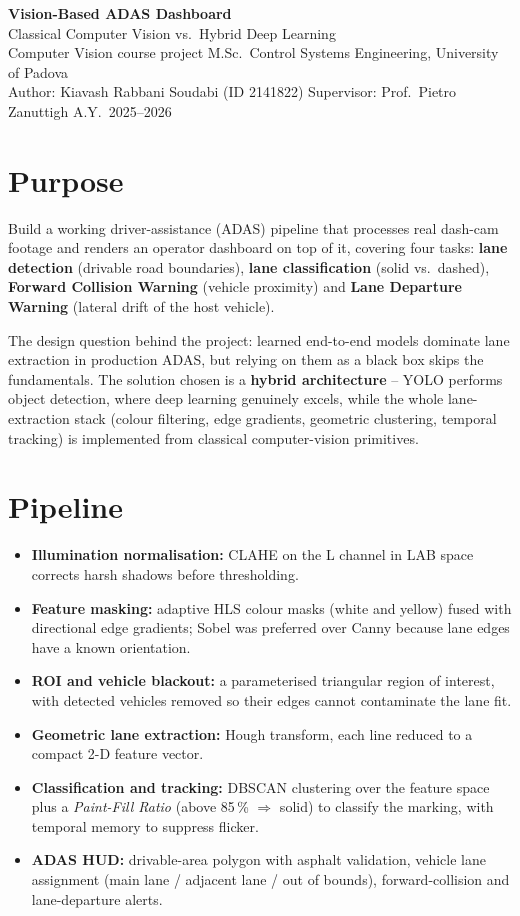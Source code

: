 \documentclass[10pt,a4paper]{article}
\begin{document}
\begin{center}
{\Large\bfseries Vision-Based ADAS Dashboard}\\[2pt]
{\large Classical Computer Vision vs.\ Hybrid Deep Learning}\\[4pt]
{\small Computer Vision course project \textendash{} M.Sc.\ Control Systems Engineering, University of Padova}\\
{\small Author: Kiavash Rabbani Soudabi (ID 2141822) \textendash{} Supervisor: Prof.\ Pietro Zanuttigh \textendash{} A.Y.\ 2025--2026}
\end{center}

\section*{Purpose}
Build a working driver-assistance (ADAS) pipeline that processes real dash-cam footage and renders an operator
dashboard on top of it, covering four tasks: \textbf{lane detection} (drivable road boundaries),
\textbf{lane classification} (solid vs.\ dashed), \textbf{Forward Collision Warning} (vehicle proximity) and
\textbf{Lane Departure Warning} (lateral drift of the host vehicle).

The design question behind the project: learned end-to-end models dominate lane extraction in production ADAS, but
relying on them as a black box skips the fundamentals. The solution chosen is a \textbf{hybrid architecture} --
YOLO performs object detection, where deep learning genuinely excels, while the whole lane-extraction stack (colour
filtering, edge gradients, geometric clustering, temporal tracking) is implemented from classical computer-vision
primitives.

\section*{Pipeline}
\begin{itemize}
  \item \textbf{Illumination normalisation:} CLAHE on the L channel in LAB space corrects harsh shadows before
        thresholding.
  \item \textbf{Feature masking:} adaptive HLS colour masks (white and yellow) fused with directional edge
        gradients; Sobel was preferred over Canny because lane edges have a known orientation.
  \item \textbf{ROI and vehicle blackout:} a parameterised triangular region of interest, with detected vehicles
        removed so their edges cannot contaminate the lane fit.
  \item \textbf{Geometric lane extraction:} Hough transform, each line reduced to a compact 2-D feature vector.
  \item \textbf{Classification and tracking:} DBSCAN clustering over the feature space plus a \emph{Paint-Fill
        Ratio} (above 85\,\% $\Rightarrow$ solid) to classify the marking, with temporal memory to suppress flicker.
  \item \textbf{ADAS HUD:} drivable-area polygon with asphalt validation, vehicle lane assignment
        (main lane / adjacent lane / out of bounds), forward-collision and lane-departure alerts.
\end{itemize}
\end{document}
